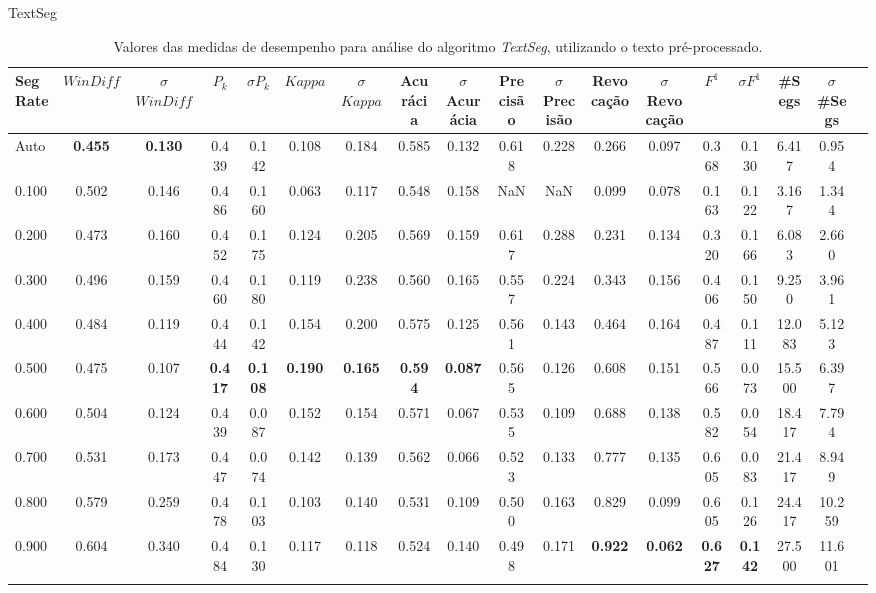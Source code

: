 \newpage
\center TextSeg
\begin{longtable}[c]{|l|c|c|c|c|c|c|c|c|c|c|c|c|c|c|c|c|c|} 
\hline 
 Seg Rate & $WinDiff$ & $\sigma$$WinDiff$ & $P_k$ & $\sigma$$P_k$ & $Kappa$ & $\sigma$$Kappa$ & Acurácia & $\sigma$Acurácia & Precisão & $\sigma$Precisão & Revocação & $\sigma$Revocação & $F^1$ & $\sigma$$F^1$ & \#Segs & $\sigma$\#Segs\\ \hline 
 Auto & \cellcolor{gray!20} \textbf{0.455} & \cellcolor{gray!20} \textbf{0.130} & 0.439 & 0.142 & 0.108 & 0.184 & 0.585 & 0.132 & 0.618 & 0.228 & 0.266 & 0.097 & 0.368 & 0.130 & 6.417 & 0.954  \\ \hline 
  0.100 & 0.502 & 0.146 & 0.486 & 0.160 & 0.063 & 0.117 & 0.548 & 0.158 & NaN & NaN & 0.099 & 0.078 & 0.163 & 0.122 & 3.167 & 1.344  \\ \hline 
  0.200 & 0.473 & 0.160 & 0.452 & 0.175 & 0.124 & 0.205 & 0.569 & 0.159 & 0.617 & 0.288 & 0.231 & 0.134 & 0.320 & 0.166 & 6.083 & 2.660  \\ \hline 
  0.300 & 0.496 & 0.159 & 0.460 & 0.180 & 0.119 & 0.238 & 0.560 & 0.165 & 0.557 & 0.224 & 0.343 & 0.156 & 0.406 & 0.150 & 9.250 & 3.961  \\ \hline 
  0.400 & 0.484 & 0.119 & 0.444 & 0.142 & 0.154 & 0.200 & 0.575 & 0.125 & 0.561 & 0.143 & 0.464 & 0.164 & 0.487 & 0.111 & 12.083 & 5.123  \\ \hline 
  0.500 & 0.475 & 0.107 & \cellcolor{gray!20} \textbf{0.417} & \cellcolor{gray!20} \textbf{0.108} & \cellcolor{gray!20} \textbf{0.190} & \cellcolor{gray!20} \textbf{0.165} & \cellcolor{gray!20} \textbf{0.594} & \cellcolor{gray!20} \textbf{0.087} & 0.565 & 0.126 & 0.608 & 0.151 & 0.566 & 0.073 & 15.500 & 6.397  \\ \hline 
  0.600 & 0.504 & 0.124 & 0.439 & 0.087 & 0.152 & 0.154 & 0.571 & 0.067 & 0.535 & 0.109 & 0.688 & 0.138 & 0.582 & 0.054 & 18.417 & 7.794  \\ \hline 
  0.700 & 0.531 & 0.173 & 0.447 & 0.074 & 0.142 & 0.139 & 0.562 & 0.066 & 0.523 & 0.133 & 0.777 & 0.135 & 0.605 & 0.083 & 21.417 & 8.949  \\ \hline 
  0.800 & 0.579 & 0.259 & 0.478 & 0.103 & 0.103 & 0.140 & 0.531 & 0.109 & 0.500 & 0.163 & 0.829 & 0.099 & 0.605 & 0.126 & 24.417 & 10.259  \\ \hline 
  0.900 & 0.604 & 0.340 & 0.484 & 0.130 & 0.117 & 0.118 & 0.524 & 0.140 & 0.498 & 0.171 & \cellcolor{gray!20} \textbf{0.922} & \cellcolor{gray!20} \textbf{0.062} & \cellcolor{gray!20} \textbf{0.627} & \cellcolor{gray!20} \textbf{0.142} & 27.500 & 11.601  \\ \hline 
 \caption{Valores das medidas de desempenho para análise do algoritmo \textit{TextSeg}, utilizando o texto pré-processado.}
 \end{longtable} 

